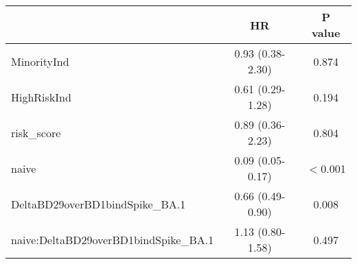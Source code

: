\begin{tabular}{lcc}
   \hline  &HR& P value\\ 
\hline
MinorityInd & 0.93 (0.38-2.30) & 0.874 \\ 
  HighRiskInd & 0.61 (0.29-1.28) & 0.194 \\ 
  risk\_score & 0.89 (0.36-2.23) & 0.804 \\ 
  naive & 0.09 (0.05-0.17) & $<$0.001 \\ 
  DeltaBD29overBD1bindSpike\_BA.1 & 0.66 (0.49-0.90) & 0.008 \\ 
  naive:DeltaBD29overBD1bindSpike\_BA.1 & 1.13 (0.80-1.58) & 0.497 \\ 
   \hline
\end{tabular}
